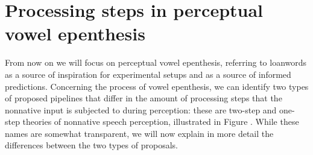 
\section{Processing steps in perceptual vowel epenthesis}

From now on we will focus on perceptual vowel epenthesis, referring to loanwords as a source of inspiration for experimental setups and as a source of informed predictions. Concerning the process of vowel epenthesis, we can identify two types of proposed pipelines that differ in the amount of processing steps that the nonnative input is subjected to during perception: these are two-step and one-step theories of nonnative speech perception, illustrated in Figure \label{ref:intro_12step}. While these names are somewhat transparent, we will now explain in more detail the differences between the two types of proposals.   

